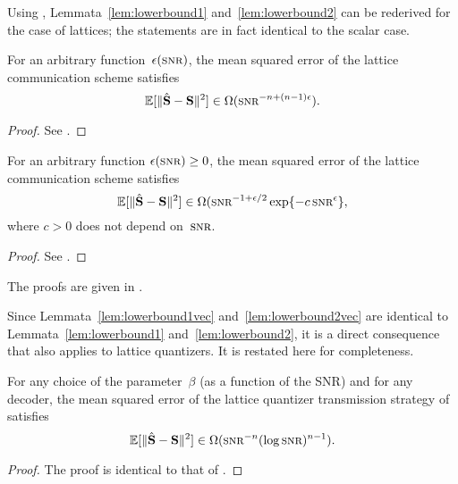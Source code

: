 Using , Lemmata~\ref{lem:lowerbound1}
and~\ref{lem:lowerbound2} can be rederived for the case of lattices; the
statements are in fact identical to the scalar case.

\begin{lemma}
  \label{lem:lowerbound1vec}
  For an arbitrary function~$\e(\snr)$, the mean squared error of the lattice
  communication scheme satisfies
  \begin{equation*}
    \msev \in \Omega(\snr^{-n + (n-1)\e}).
  \end{equation*}
\end{lemma}

\begin{proof}
  See .
\end{proof}

\begin{lemma}
  \label{lem:lowerbound2vec}
  For an arbitrary function $\e(\snr) \ge 0$, the mean squared error of the
  lattice communication scheme satisfies
  \begin{equation*}
    \msev \in \Omega(\snr^{-1 + \e/2} \exp\{- c \snr^\e \},
  \end{equation*}
  where $c > 0$ does not depend on~$\snr$.
\end{lemma}

\begin{proof}
  See .
\end{proof}

The proofs are given in .

Since Lemmata~\ref{lem:lowerbound1vec} and~\ref{lem:lowerbound2vec} are
identical to Lemmata~\ref{lem:lowerbound1} and~\ref{lem:lowerbound2}, it is a
direct consequence that  also applies to lattice quantizers.
It is restated here for completeness.

\begin{theorem}
  \label{thm:scalinglbvec}
  For any choice of the parameter~$\beta$ (as a function of the SNR) and for any
  decoder, the mean squared error of the lattice quantizer transmission strategy
  of  satisfies
  \begin{equation*}
    \msev \in \Omega(\snr^{-n} (\log\snr)^{n-1}).
  \end{equation*}
\end{theorem}

\begin{proof}
  The proof is identical to that of .
\end{proof}


